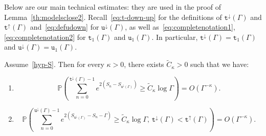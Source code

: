 \documentclass[AHL,Unicode,longabstracts,published]{cedram}
\newcommand{\bbP}{\mathbb{P}}
\newcommand{\gG}{\Gamma}
\renewcommand*\ss{\mathtt{u}}
\newcommand{\ttt}{\mathtt{t}}
\newcommand*\td{{\ttt}^\downarrow}
\newcommand*\tup{{\ttt}^\uparrow}
\newcommand{\tudown}{\ss^\downarrow}
\newcommand*{\relabel}{\renewcommand{\labelenumi}{(\theenumi)}}
\newcommand*{\romanenumi}{\renewcommand*{\theenumi}{\roman{enumi}}\relabel}
\begin{document}
Below are our main technical estimates: they are used in the proof of Lemma~\ref{th:modelsclose2}. {Recall~\eqref{eq:t-down-up} for the definitions of $\td(\gG)$ and $\tup(\gG)$ and~\eqref{eq:defudown} for $\tudown(\Gamma)$, as well as~\eqref{eq:completenotation1}, \eqref{eq:completenotation2} for $\ttt_1(\Gamma)$ and $\ss_1(\Gamma)$. In particular, $\td(\gG)= \ttt_1(\Gamma)$ and $\tudown(\Gamma)=\ss_1(\Gamma)$.}


\pagebreak
\begin{lemm}\label{th:expomoments}
Assume~\eqref{hyp-S}. Then for every $\kappa>0$, there exists $\widetilde{C}_\kappa>0$ such that we have:
\begin{enumerate}\romanenumi
\item \label{lemmA.3.1}
\begin{equation}\label{expon1}
\bbP\left(\sum_{n=0}^{\td(\Gamma)-1} e^{2\left(S_n-S_{\tudown(\Gamma)}\right)}
\ge \widetilde{C}_\kappa \log \gG\right)=O\left(\gG^{-\kappa}\right).
\end{equation}
\item\label{lemmA.3.2}
\begin{equation}\label{expon2}
\bbP\left(\sum_{n=0}^{\tudown(\gG)-1} e^{2\left(S_{\tudown(\gG)}-S_n-\Gamma\right)}
\ge \widetilde{C}_\kappa \log \gG, \, \td(\gG)<\tup(\gG)\right)=O\left(\gG^{-\kappa}\right). 
\end{equation}
\end{enumerate}
\end{lemm}
\end{document}
